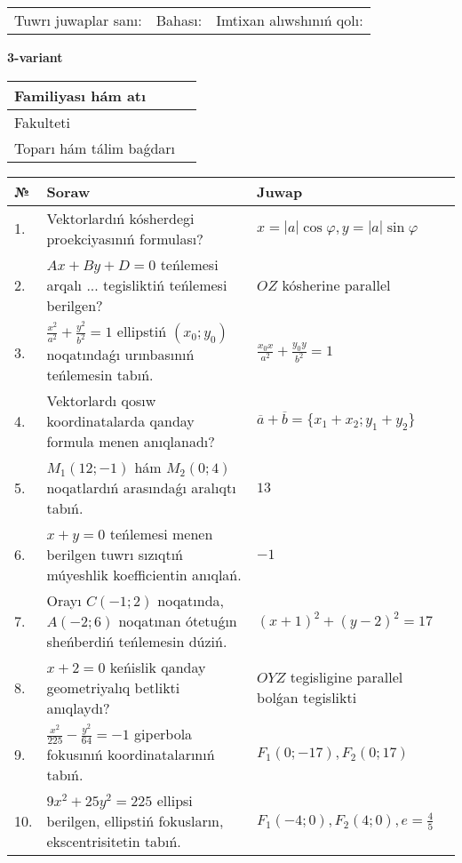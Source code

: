 \documentclass{article}
\begin{document}
\vspace{1cm}

\begin{tabular}{lll}
Tuwrı juwaplar sanı: \underline{\hspace{1.5cm}} & 
Bahası: \underline{\hspace{1.5cm}} & 
Imtixan alıwshınıń qolı: \underline{\hspace{2cm}} \\
\end{tabular}

\egroup

\newpage


\textbf{3-variant}\\

\bgroup
\def\arraystretch{1.6} %

\begin{tabular}{|m{5.7cm}|m{9.5cm}|}
\hline
Familiyası hám atı & \\
\hline
Fakulteti  & \\
\hline
Toparı hám tálim baǵdarı  & \\
\hline
\end{tabular}

\vspace{1cm}

\begin{tabular}{|m{0.7cm}|m{10cm}|m{4cm}|}
\hline
№ & Soraw & Juwap \\
\hline
1. & Vektorlardıń kósherdegi proekciyasınıń formulası? & $x=|a|\cos\varphi, y=|a|\sin\varphi$ \\
\hline
2. & $Ax+By+D=0$ teńlemesi arqalı ... tegisliktiń teńlemesi berilgen? & $OZ$ kósherine parallel \\
\hline
3. & $\frac{x^2}{a^2}+\frac{y^2}{b^2}=1$ ellipstiń $(x_0;y_0)$ noqatındaǵı urınbasınıń teńlemesin tabıń. & $\frac{x_0x}{a^2}+\frac{y_0y}{b^2}=1$ \\
\hline
4. & Vektorlardı qosıw koordinatalarda qanday formula menen anıqlanadı? & $\overline{a}+\overline{b}=\{x_1+x_2;y_1+y_2\}$ \\
\hline
5. & $M_{1} (12;-1)$ hám $M_{2} (0;4)$ noqatlardıń arasındaǵı aralıqtı tabıń. & $13$ \\
\hline
6. & $x+y=0$ teńlemesi menen berilgen tuwrı sızıqtıń múyeshlik koefficientin anıqlań. & $- 1$ \\
\hline
7. & Orayı $C (-1;2)$ noqatında, $A (-2;6 )$ noqatınan ótetuǵın sheńberdiń teńlemesin dúziń. & $(x+1)^{2}+(y-2)^{2}=17$ \\
\hline
8. & $x+2=0$ keńislik qanday geometriyalıq betlikti anıqlaydı? &  $OYZ$ tegisligine parallel bolǵan tegislikti \\
\hline
9. & $\frac{x^{2}}{225}-\frac{y^{2}}{64}=-1$ giperbola fokusınıń koordinatalarınıń tabıń. & $F_{1}(0;-17), F_{2}(0;17)$ \\
\hline
10. & $9x^{2}+25y^{2}=225$ ellipsi berilgen, ellipstiń fokusların, ekscentrisitetin tabıń. & $F_1\left(-4;0 \right) , F_2\left( 4;0 \right) , e = \frac{4}{5}$ \\
\hline
\end{tabular}
\end{document}
